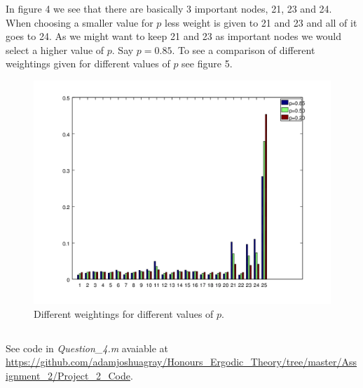 \documentclass{unswmaths}
\begin{document}
In figure 4 we see that there are basically 3 important nodes, 21, 23 and 24. When choosing a smaller value for $ p $ less weight is given to 21 and 23 and all of it goes to 24. As we might want to keep 21 and 23 as important nodes we would select a higher value of $ p $. Say $ p = 0.85 $.
To see a comparison of different weightings given for different values of $ p $ see figure 5.

\begin{figure}[h]
    \includegraphics[scale=0.7]{Different_ps}
    \caption{Different weightings for different values of $ p $.}
\end{figure}
\clearpage
\subsection{}
See code in \emph{Question\_4.m} avaiable at \url{https://github.com/adamjoshuagray/Honours_Ergodic_Theory/tree/master/Assignment_2/Project_2_Code}. 
\end{document}
